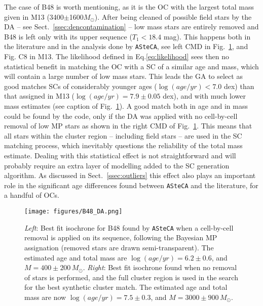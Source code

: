 \documentclass{aa}
\begin{document}
The case of B48 is worth mentioning, as it is the OC with the largest total mass
given in M13 (3400$\pm$1600$M_{\odot}$).
After being cleaned of possible field stars by the DA -- see
Sect.~\ref{ssec:dencontamination} -- low mass stars are entirely removed and B48
is left only with its upper sequence ($T_1<18.4$ mag).
This happens both in the literature and in the analysis done by \texttt{ASteCA},
see left CMD in Fig.~\ref{fig:B48_DA}, and Fig. C8 in M13.
%
The likelihood defined in Eq.\ref{eq:likelihood} sees then no statistical
benefit in matching the OC with a SC of a similar age and mass,
which will contain a large number of low mass stars.
This leads the GA to select as good matches SCs of considerably
younger ages ($\log(age/yr){<}7.0$ dex) than that assigned in M13
($\log(age/yr){=}7.9\pm0.05$ dex), and with much lower mass estimates (see
caption of Fig.~\ref{fig:B48_DA}).
%
%
A good match both in age and in mass could be found by the code, only if the DA
was applied with no cell-by-cell removal of low MP stars as shown in the right
CMD of Fig.~\ref{fig:B48_DA}. This means that all stars within the cluster
region -- including field stars -- are used in the SC matching process, which
inevitably questions the reliability of the total mass estimate.
%
Dealing with this statistical effect is not straightforward and will probably
require an extra layer of modelling added to the SC generation algorithm.
As discussed in Sect.~\ref{ssec:outliers} this effect also plays an important
role in the significant age differences found between \texttt{ASteCA} and the
literature, for a handful of OCs.

\begin{figure}
\centering
\texttt{[image: figures/B48\_DA.png]}
\caption{\emph{Left}: Best fit isochrone for B48 found by \texttt{ASteCA} when
a cell-by-cell removal is applied on its sequence, following the Bayesian MP
assignation (removed stars are drawn semi-transparent). The estimated age and
total mass are $\log(age/yr){=}6.2{\pm}0.6$, and $M{=}400{\pm}200\,M_{\odot}$.
\emph{Right}: Best fit isochrone found when no removal of stars is performed,
and the full cluster region is used in the search for the best synthetic
cluster match. The estimated age and total mass are now
$\log(age/yr){=}7.5{\pm}0.3$, and $M{=}3000{\pm}900\,M_{\odot}$.}
\label{fig:B48_DA}
\end{figure}
\end{document}
